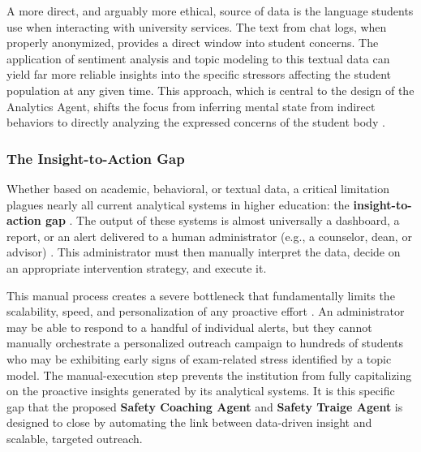 A more direct, and arguably more ethical, source of data is the language students use when interacting with university services. The text from chat logs, when properly anonymized, provides a direct window into student concerns. The application of sentiment analysis and topic modeling to this textual data can yield far more reliable insights into the specific stressors affecting the student population at any given time. This approach, which is central to the design of the Analytics Agent, shifts the focus from inferring mental state from indirect behaviors to directly analyzing the expressed concerns of the student body \cite{paolucci2024wellbeinganalytics}.

\subsubsection{The Insight-to-Action Gap}
Whether based on academic, behavioral, or textual data, a critical limitation plagues nearly all current analytical systems in higher education: the \textbf{insight-to-action gap} \cite{jorno2018actionableinsight}. The output of these systems is almost universally a dashboard, a report, or an alert delivered to a human administrator (e.g., a counselor, dean, or advisor) \cite{susnjak2022dashboard}. This administrator must then manually interpret the data, decide on an appropriate intervention strategy, and execute it.

This manual process creates a severe bottleneck that fundamentally limits the scalability, speed, and personalization of any proactive effort \cite{kaliisa2023hypedashboards}. An administrator may be able to respond to a handful of individual alerts, but they cannot manually orchestrate a personalized outreach campaign to hundreds of students who may be exhibiting early signs of exam-related stress identified by a topic model. The manual-execution step prevents the institution from fully capitalizing on the proactive insights generated by its analytical systems. It is this specific gap that the proposed \textbf{Safety Coaching Agent} and \textbf{Safety Traige Agent} is designed to close by automating the link between data-driven insight and scalable, targeted outreach.


